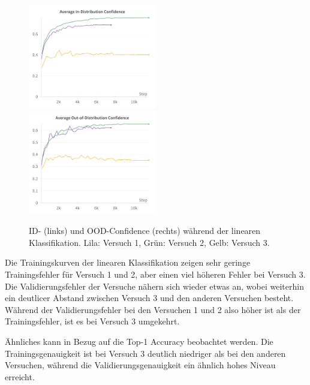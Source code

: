 \begin{figure}[]
	\centering
	\includegraphics[width=0.5\textwidth]{figure_results_supcon-lin_avg-id-conf.png}%
	\includegraphics[width=0.5\textwidth]{figure_results_supcon-lin_avg-ood-conf.png}
	\caption[ID- (links) und OOD-Confidence (rechts) während der linearen Klassifikation.]{ID- (links) und OOD-Confidence (rechts) während der linearen Klassifikation. \textcolor{exp1}{Lila}: Versuch 1, \textcolor{exp2}{Grün}: Versuch 2, \textcolor{exp3}{Gelb}: Versuch 3.}
	\label{fig:supcon-lin-ood-detection}
\end{figure}

Die Trainingskurven der linearen Klassifikation zeigen sehr geringe Trainingsfehler für Versuch 1 und 2, aber einen viel höheren Fehler bei Versuch 3. Die Validierungsfehler der Versuche nähern sich wieder etwas an, wobei weiterhin ein deutlicer Abstand zwischen Versuch 3 und den anderen Versuchen besteht. Während der Validierungsfehler bei den Versuchen 1 und 2 also höher ist als der Trainingsfehler, ist es bei Versuch 3 umgekehrt.

Ähnliches kann in Bezug auf die Top-1 Accuracy beobachtet werden. Die Trainingsgenauigkeit ist bei Versuch 3 deutlich niedriger als bei den anderen Versuchen, während die Validierungsgenauigkeit ein ähnlich hohes Niveau erreicht.

